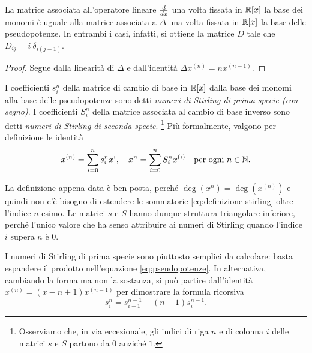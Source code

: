 \begin{teor}
La matrice associata all'operatore lineare $\cramped{\frac{d}{dx}}$
una volta fissata in $\mathbb{R}[x]$ la base dei monomi è uguale alla matrice
associata a $\Delta$ una volta fissata in $\mathbb{R}[x]$ la base delle pseudopotenze.
In entrambi i casi, infatti, si ottiene la matrice $D$ tale che
$D_{ij} = i \:\! \delta_{i(j-1)}$.
\end{teor}

\begin{proof}
Segue dalla linearità di $\Delta$ e dall'identità $\Delta x^{(n)} = n x^{(n-1)}$.
\end{proof}

\begin{defi}
I coefficienti $s_i^n$ della matrice
di cambio di base in $\mathbb{R}[x]$ dalla base
dei monomi alla base delle pseudopotenze sono detti
\emph{numeri di Stirling di prima specie (con segno)}.
I coefficienti $S_i^n$ della matrice associata al cambio di base inverso
sono detti \emph{numeri di Stirling di seconda specie}.%
\footnote{Osserviamo che, in via eccezionale,
gli indici di riga $n$ e di colonna $i$
delle matrici $s$ e $S$ partono da $0$ anziché $1$.}
Più formalmente, valgono per definizione le identità
\begin{equation} \label{eq:definizione-stirling}
x^{(n)} = \sum_{i=0}^{n} s_i^n x^i,
\quad
x^n = \sum_{i=0}^{n} S_i^n x^{(i)}
\quad
\text{per ogni $n \in \mathbb{N}$.}
\end{equation}
\end{defi}

La definizione appena data è ben posta, perché $\deg(x^n)=\deg(x^{(n)})$
e quindi non c'è bisogno di estendere le sommatorie \eqref{eq:definizione-stirling}
oltre l'indice $n$-esimo.
Le matrici $s$ e $S$ hanno dunque struttura triangolare inferiore,
perché l'unico valore che ha senso attribuire ai numeri di Stirling
quando l'indice $i$ supera $n$ è 0.

I numeri di Stirling di prima specie sono piuttosto semplici da calcolare:
basta espandere il prodotto nell'equazione \eqref{eq:pseudopotenze}.
In alternativa, cambiando la forma ma non la sostanza, si può partire
dall'identità $x^{(n)} = (x-n+1) x^{(n-1)}$ per dimostrare la formula ricorsiva
\begin{equation} \label{eq:ricorrenza-prima-specie}
s_i^n = s_{i-1}^{n-1} - (n-1)s_i^{n-1}.
\end{equation}

